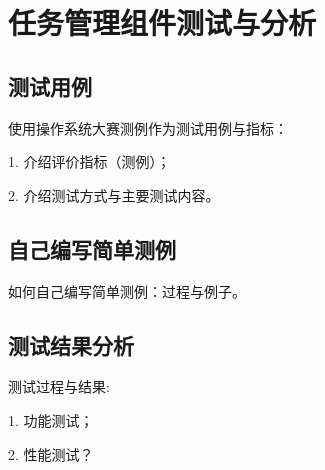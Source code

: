 
\chapter{任务管理组件测试与分析}

\section{测试用例}

使用操作系统大赛测例作为测试用例与指标：

1. 介绍评价指标（测例）；

2. 介绍测试方式与主要测试内容。


\section{自己编写简单测例}

如何自己编写简单测例：过程与例子。



\section{测试结果分析}

测试过程与结果:

1. 功能测试；

2. 性能测试？

